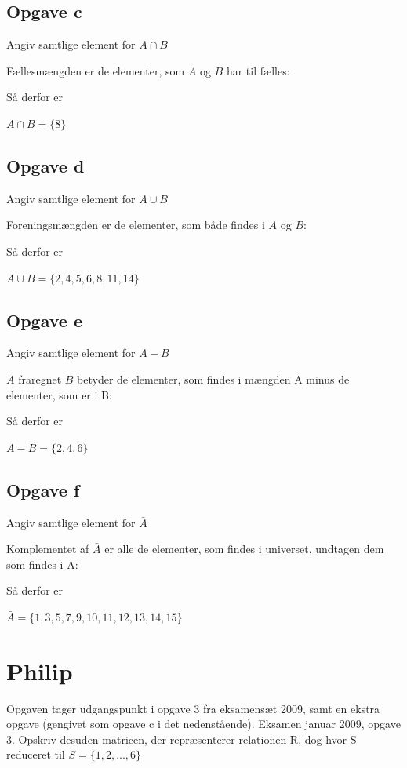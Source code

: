 \documentclass{article}
\begin{document}
\subsection*{Opgave c}
Angiv samtlige element for $A \cap B$

Fællesmængden er de elementer, som $A$ og $B$ har til fælles:

Så derfor er

\begin{center}
$A \cap B = \{ 8 \}$  
\end{center}

\subsection*{Opgave d}
Angiv samtlige element for $A \cup B$

Foreningsmængden er de elementer, som både findes i $A$ og $B$:

Så derfor er

\begin{center}
$A \cup B = \{ 2, 4, 5, 6, 8, 11, 14 \}$  
\end{center}

\subsection*{Opgave e}
Angiv samtlige element for $A - B$

$A$ fraregnet $B$ betyder de elementer, som findes i mængden A minus de elementer, som er i B:

Så derfor er

\begin{center}
$A - B = \{ 2, 4, 6 \}$  
\end{center}

\subsection*{Opgave f}
Angiv samtlige element for $\bar{A}$

Komplementet af $\bar{A}$ er alle de elementer, som findes i universet, undtagen dem som findes i A:

Så derfor er

\begin{center}
$\bar{A} = \{ 1, 3, 5, 7, 9, 10, 11, 12, 13, 14, 15 \}$  
\end{center}

\section{Philip}
Opgaven tager udgangspunkt i opgave 3 fra eksamensæt 2009, samt en ekstra opgave (gengivet som opgave c i det nedenstående).
Eksamen januar 2009, opgave 3. Opskriv desuden matricen, der repræsenterer relationen R, dog hvor S reduceret til $S = \{1,2,...,6\}$
\end{document}
